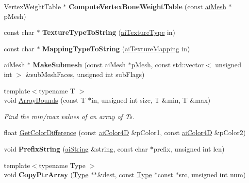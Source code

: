 \begin{DoxyCompactItemize}
\item 
\hypertarget{namespace_assimp_ad9061ea2fffdd9a49a1a56852615270c}{Vertex\+Weight\+Table $\ast$ {\bfseries Compute\+Vertex\+Bone\+Weight\+Table} (const \hyperlink{structai_mesh}{ai\+Mesh} $\ast$p\+Mesh)}\label{namespace_assimp_ad9061ea2fffdd9a49a1a56852615270c}

\item 
\hypertarget{namespace_assimp_a1cd196c316bf715e2d1d35d733823c79}{const char $\ast$ {\bfseries Texture\+Type\+To\+String} (\hyperlink{material_8h_a7dd415ff703a2cc53d1c22ddbbd7dde0}{ai\+Texture\+Type} in)}\label{namespace_assimp_a1cd196c316bf715e2d1d35d733823c79}

\item 
\hypertarget{namespace_assimp_a7fb213704d10e18fc99f6c7130f77a0d}{const char $\ast$ {\bfseries Mapping\+Type\+To\+String} (\hyperlink{material_8h_a6186e909f1ae28133ab10f1b4635b0f9}{ai\+Texture\+Mapping} in)}\label{namespace_assimp_a7fb213704d10e18fc99f6c7130f77a0d}

\item 
\hypertarget{namespace_assimp_a476ab338ceda1bea0692f9dfc1297d77}{\hyperlink{structai_mesh}{ai\+Mesh} $\ast$ {\bfseries Make\+Submesh} (const \hyperlink{structai_mesh}{ai\+Mesh} $\ast$p\+Mesh, const std\+::vector$<$ unsigned int $>$ \&sub\+Mesh\+Faces, unsigned int sub\+Flags)}\label{namespace_assimp_a476ab338ceda1bea0692f9dfc1297d77}

\item 
{\footnotesize template$<$typename T $>$ }\\void \hyperlink{namespace_assimp_a4bd560c5925177fe3db8c0ef39338b17}{Array\+Bounds} (const T $\ast$in, unsigned int size, T \&min, T \&max)
\begin{DoxyCompactList}\small\item\em Find the min/max values of an array of Ts. \end{DoxyCompactList}\item 
float \hyperlink{namespace_assimp_a19ad49cb7574ea17c7bc1e9376cac0fa}{Get\+Color\+Difference} (const \hyperlink{structai_color4_d}{ai\+Color4\+D} \&p\+Color1, const \hyperlink{structai_color4_d}{ai\+Color4\+D} \&p\+Color2)
\item 
\hypertarget{namespace_assimp_af7e2df7d828c601812df5d814f6018ca}{void {\bfseries Prefix\+String} (\hyperlink{structai_string}{ai\+String} \&string, const char $\ast$prefix, unsigned int len)}\label{namespace_assimp_af7e2df7d828c601812df5d814f6018ca}

\item 
\hypertarget{namespace_assimp_aafb02a2faed5794e0903944358626ce4}{{\footnotesize template$<$typename Type $>$ }\\void {\bfseries Copy\+Ptr\+Array} (\hyperlink{struct_type}{Type} $\ast$$\ast$\&dest, const \hyperlink{struct_type}{Type} $\ast$const $\ast$src, unsigned int num)}\label{namespace_assimp_aafb02a2faed5794e0903944358626ce4}


\end{DoxyCompactItemize}
